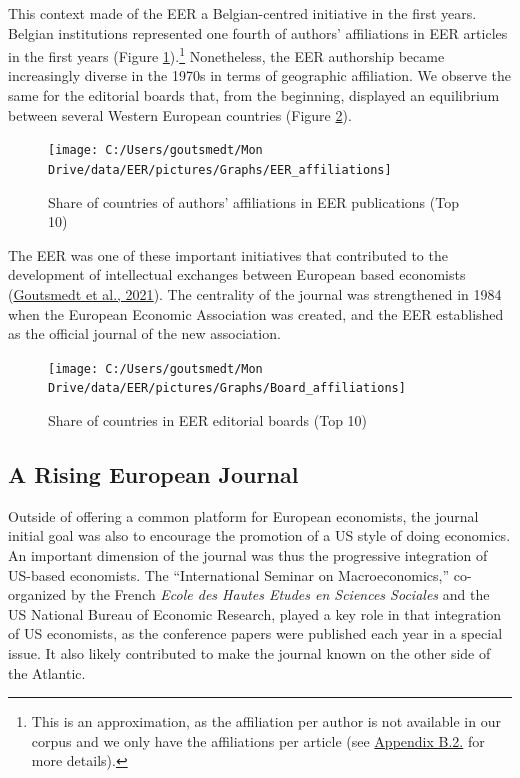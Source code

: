 \documentclass[]{elsarticle} %
\begin{document}
This context made of the EER a Belgian-centred initiative in the first
years. Belgian institutions represented one fourth of authors'
affiliations in EER articles in the first years (Figure
\ref{fig:plot-authors}).\footnote{This is an approximation, as the
  affiliation per author is not available in our corpus and we only have
  the affiliations per article (see
  \protect\hyperlink{author-affiliation}{Appendix B.2.} for more
  details).} Nonetheless, the EER authorship became increasingly diverse
in the 1970s in terms of geographic affiliation. We observe the same for
the editorial boards that, from the beginning, displayed an equilibrium
between several Western European countries (Figure
\ref{fig:plot-boards}).

\begin{figure}[h]

{\centering \texttt{[image: C:/Users/goutsmedt/Mon Drive/data/EER/pictures/Graphs/EER\_affiliations]} 

}

\caption{Share of countries of authors' affiliations in EER publications (Top 10)}\label{fig:plot-authors}
\end{figure}

The EER was one of these important initiatives that contributed to the
development of intellectual exchanges between European based economists
(\protect\hyperlink{ref-goutsmedt2021}{Goutsmedt et al., 2021}). The
centrality of the journal was strengthened in 1984 when the European
Economic Association was created, and the EER established as the
official journal of the new association.

\begin{figure}[h]

{\centering \texttt{[image: C:/Users/goutsmedt/Mon Drive/data/EER/pictures/Graphs/Board\_affiliations]} 

}

\caption{Share of countries in EER editorial boards (Top 10)}\label{fig:plot-boards}
\end{figure}

\hypertarget{rising-journal}{%
\subsection{A Rising European Journal}\label{rising-journal}}

Outside of offering a common platform for European economists, the
journal initial goal was also to encourage the promotion of a US style
of doing economics. An important dimension of the journal was thus the
progressive integration of US-based economists. The ``International
Seminar on Macroeconomics,'' co-organized by the French \emph{Ecole des
Hautes Etudes en Sciences Sociales} and the US National Bureau of
Economic Research, played a key role in that integration of US
economists, as the conference papers were published each year in a
special issue. It also likely contributed to make the journal known on
the other side of the Atlantic.
\end{document}
